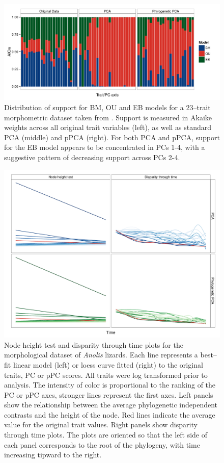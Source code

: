 \documentclass[12pt,twoside]{article}
\begin{document}
\begin{figure}[p]
\centering
\includegraphics[scale=0.65]{./fig/anoles_aicw.pdf}
\caption[Model support on the \emph{Anolis} dataset]{Distribution of support for BM, OU and EB models for a 23--trait morphometric dataset taken from \citet{Mahler2010}. Support is measured in Akaike weights across all original trait variables (left), as well as standard PCA (middle) and pPCA (right). For both PCA and pPCA, support for the EB model appears to be concentrated in PCs 1-4, with a suggestive pattern of decreasing support across PCs 2-4. }
\label{anoles_aicw}
\end{figure}

\begin{figure}[p]
\centering
\includegraphics[scale=0.65]{./fig/anoles_nh-dtt.pdf}
\caption[Node height test and disparity through time on the \emph{Anolis} dataset]{Node height test and disparity through time plots for the morphological dataset of \textit{Anolis} lizards. Each line represents a best--fit linear model (left) or loess curve fitted (right) to the original traits, PC or pPC scores. All traits were log transformed prior to analysis. The intensity of color is proportional to the ranking of the PC or pPC axes, stronger lines represent the first axes. Left panels show the relationship between the average phylogenetic independent contrasts and the height of the node. Red lines indicate the average value for the original trait values. Right panels show disparity through time plots. The plots are oriented so that the left side of each panel corresponds to the root of the phylogeny, with time increasing tipward to the right. }
\label{anoles_nh}
\end{figure}


\clearpage


\end{document}
